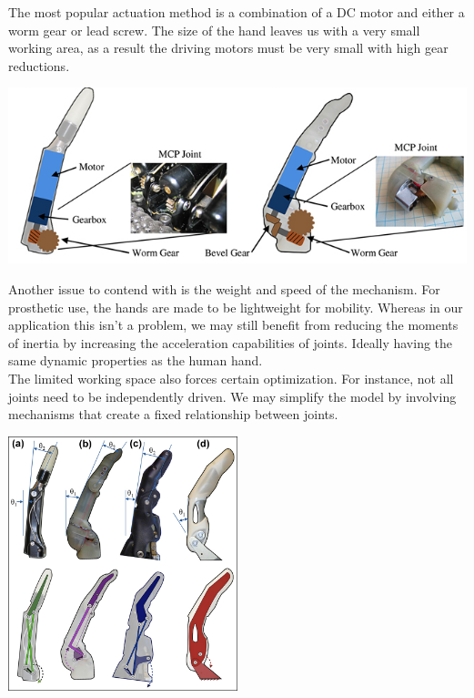 \documentclass{article}
\begin{document}
The most popular actuation method is a combination of a DC motor and either a worm gear or lead screw. The size of the hand leaves us with a very small working area, as a result the driving motors must be very small with high gear reductions.

\begin{center}
\includegraphics[width=\textwidth]{IMG/fingerMech2.png}
\end{center}

Another issue to contend with is the weight and speed of the mechanism. For prosthetic use, the hands are made to be lightweight for mobility. Whereas in our application this isn't a problem, we may still benefit from reducing the moments of inertia by increasing the acceleration capabilities of joints. Ideally having the same dynamic properties as the human hand.\\[12pt]
\indent The limited working space also forces certain optimization. For instance, not all joints need to be independently driven. We may simplify the model by involving mechanisms that create a fixed relationship between joints.

\begin{center}
\includegraphics[width=0.5\textwidth]{IMG/fingerMech.jpg}
\end{center}
\end{document}
